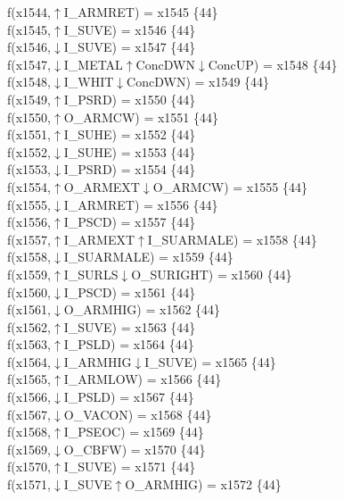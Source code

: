 f(x1544,$\uparrow$I\_ARMRET) = x1545 \{44\} \\  
f(x1545,$\uparrow$I\_SUVE) = x1546 \{44\} \\  
f(x1546,$\downarrow$I\_SUVE) = x1547 \{44\} \\  
f(x1547,$\downarrow$I\_METAL$\uparrow$ConcDWN$\downarrow$ConcUP) = x1548 \{44\} \\  
f(x1548,$\downarrow$I\_WHIT$\downarrow$ConcDWN) = x1549 \{44\} \\  
f(x1549,$\uparrow$I\_PSRD) = x1550 \{44\} \\  
f(x1550,$\uparrow$O\_ARMCW) = x1551 \{44\} \\  
f(x1551,$\uparrow$I\_SUHE) = x1552 \{44\} \\  
f(x1552,$\downarrow$I\_SUHE) = x1553 \{44\} \\  
f(x1553,$\downarrow$I\_PSRD) = x1554 \{44\} \\  
f(x1554,$\uparrow$O\_ARMEXT$\downarrow$O\_ARMCW) = x1555 \{44\} \\  
f(x1555,$\downarrow$I\_ARMRET) = x1556 \{44\} \\  
f(x1556,$\uparrow$I\_PSCD) = x1557 \{44\} \\  
f(x1557,$\uparrow$I\_ARMEXT$\uparrow$I\_SUARMALE) = x1558 \{44\} \\  
f(x1558,$\downarrow$I\_SUARMALE) = x1559 \{44\} \\  
f(x1559,$\uparrow$I\_SURLS$\downarrow$O\_SURIGHT) = x1560 \{44\} \\  
f(x1560,$\downarrow$I\_PSCD) = x1561 \{44\} \\  
f(x1561,$\downarrow$O\_ARMHIG) = x1562 \{44\} \\  
f(x1562,$\uparrow$I\_SUVE) = x1563 \{44\} \\  
f(x1563,$\uparrow$I\_PSLD) = x1564 \{44\} \\  
f(x1564,$\downarrow$I\_ARMHIG$\downarrow$I\_SUVE) = x1565 \{44\} \\  
f(x1565,$\uparrow$I\_ARMLOW) = x1566 \{44\} \\  
f(x1566,$\downarrow$I\_PSLD) = x1567 \{44\} \\  
f(x1567,$\downarrow$O\_VACON) = x1568 \{44\} \\  
f(x1568,$\uparrow$I\_PSEOC) = x1569 \{44\} \\  
f(x1569,$\downarrow$O\_CBFW) = x1570 \{44\} \\  
f(x1570,$\uparrow$I\_SUVE) = x1571 \{44\} \\  
f(x1571,$\downarrow$I\_SUVE$\uparrow$O\_ARMHIG) = x1572 \{44\} \\  
